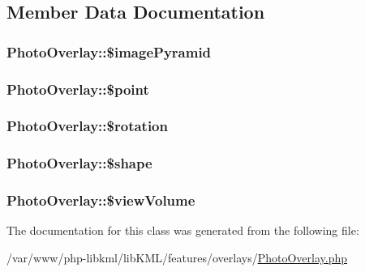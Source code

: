 \subsection{Member Data Documentation}
\hypertarget{classPhotoOverlay_ab5d5dc3442461c396ce3debbab8ba150}{
\subsubsection[{\$imagePyramid}]{\setlength{\rightskip}{0pt plus 5cm}PhotoOverlay::\$imagePyramid}}
\label{df/d99/classPhotoOverlay_ab5d5dc3442461c396ce3debbab8ba150}
\hypertarget{classPhotoOverlay_a8f0af1bc117dfd170a416c72c992c0f0}{
\subsubsection[{\$point}]{\setlength{\rightskip}{0pt plus 5cm}PhotoOverlay::\$point}}
\label{df/d99/classPhotoOverlay_a8f0af1bc117dfd170a416c72c992c0f0}
\hypertarget{classPhotoOverlay_a2aad7589f2efda0a97b373bbcbeeb3d3}{
\subsubsection[{\$rotation}]{\setlength{\rightskip}{0pt plus 5cm}PhotoOverlay::\$rotation}}
\label{df/d99/classPhotoOverlay_a2aad7589f2efda0a97b373bbcbeeb3d3}
\hypertarget{classPhotoOverlay_a9066898d4c26ba8b18bc863e39553879}{
\subsubsection[{\$shape}]{\setlength{\rightskip}{0pt plus 5cm}PhotoOverlay::\$shape}}
\label{df/d99/classPhotoOverlay_a9066898d4c26ba8b18bc863e39553879}
\hypertarget{classPhotoOverlay_af346c3cea435bb99ee00ac5d705e11d8}{
\subsubsection[{\$viewVolume}]{\setlength{\rightskip}{0pt plus 5cm}PhotoOverlay::\$viewVolume}}
\label{df/d99/classPhotoOverlay_af346c3cea435bb99ee00ac5d705e11d8}


The documentation for this class was generated from the following file:\begin{DoxyCompactItemize}
\item 
/var/www/php-\/libkml/libKML/features/overlays/\hyperlink{PhotoOverlay_8php}{PhotoOverlay.php}\end{DoxyCompactItemize}
